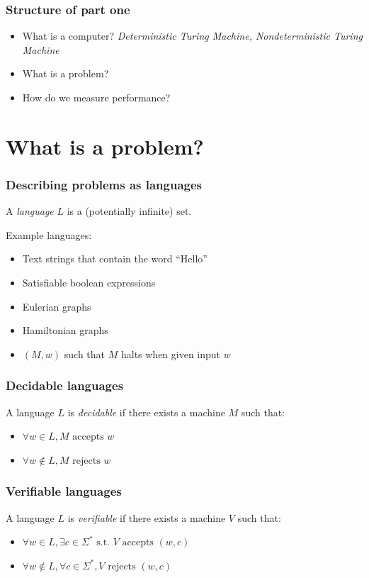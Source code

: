 \documentclass[aspectratio=169]{beamer}
\begin{document}
\begin{frame}
\frametitle{Structure of part one}
\begin{itemize}
    \item What is a computer? {\em Deterministic Turing Machine, Nondeterministic Turing Machine}
    \item What is a problem?
    \item How do we measure performance?
\end{itemize}
\end{frame}

\section{What is a problem?}

\begin{frame}
\frametitle{Describing problems as languages}
A {\em language} $L$ is a (potentially infinite) set.

Example languages:
\begin{itemize}
    \item<1-> Text strings that contain the word ``Hello''
    \item<2-> Satisfiable boolean expressions
    \item<3-> Eulerian graphs
    \item<4-> Hamiltonian graphs
    \item<5-> $(M, w)$ such that $M$ halts when given input $w$
\end{itemize}
\end{frame}

\begin{frame}
\frametitle{Decidable languages}
A language $L$ is {\em decidable} if there exists a machine $M$ such that:

\begin{itemize}
    \item $\forall w \in L, M \text{ accepts } w$
    \item $\forall w \notin L, M \text{ rejects } w$
\end{itemize}
\end{frame}

\begin{frame}
\frametitle{Verifiable languages}
A language $L$ is {\em verifiable} if there exists a machine $V$ such that:

\begin{itemize}
    \item $\forall w \in L, \exists c \in \Sigma^* \text{ s.t. } V \text{ accepts } (w,c)$
    \item $\forall w \notin L, \forall c \in \Sigma^*, V \text{ rejects } (w,c)$
\end{itemize}
\end{frame}
\end{document}
